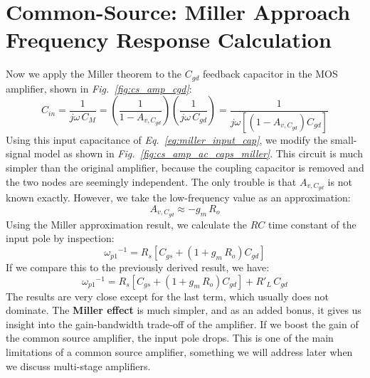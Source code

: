 \section{Common-Source:  Miller Approach Frequency Response Calculation}
Now we apply the Miller theorem to the $C_{gd}$ feedback capacitor in the MOS amplifier, shown in \emph{Fig.~\ref{fig:cs_amp_cgd}}:  
    \begin{equation}
        C_{in} = \frac{1}{{j\omega\,C_M}} = \left(\frac{1}{1 - A_{v,C_{gd}}}\right) \left(\frac{1}{j\omega\,C_{gd}}\right)
        = \frac{1}{j\omega \left[\left(1 - A_{v,C_{gd}}\right)C_{gd}\right]}
        \label{eq:miller_input_cap}
    \end{equation}
Using this input capacitance of \emph{Eq.~\ref{eq:miller_input_cap}}, we modify the small-signal model as shown in \emph{Fig.~\ref{fig:cs_amp_ac_caps_miller}}.  This circuit is much simpler than the original amplifier, because the coupling capacitor is removed and the two nodes are seemingly independent.   The only trouble is that $A_{v,C_{gd}}$ is not known exactly.  However, we take the low-frequency value as an approximation:
    \begin{equation}
        A_{v,C_{gd}} \approx -g_m\,R_o
    \end{equation}
Using the Miller approximation result, we calculate the $RC$ time constant of the input pole by inspection:
    \begin{equation}
        {\omega _{p1}}^{-1} = R_s\left[C_{gs} + \left(1 + g_m\,R_o\right)C_{gd}\right]
    \end{equation}
If we compare this to the previously derived result, we have:
    \begin{equation} 
        {\omega _{p1}}^{-1} = R_s\left[C_{gs} + \left(1 + g_m\,R_o\right)C_{gd}\right] + R'_L\,C_{gd}
    \end{equation}
The results are very close except for the last term, which usually does not dominate.  The \textbf{Miller effect} is much simpler, and as an added bonus, it gives us insight into the gain-bandwidth trade-off of the amplifier.  If we boost the gain of the common source amplifier, the input pole drops.  This is one of the main limitations of a common source amplifier, something we will address later when we discuss multi-stage amplifiers.
